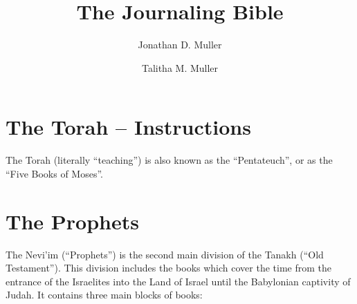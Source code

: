 \documentclass[std]{jbible}
\title{The Journaling Bible}
\author{Jonathan D. Muller}
\author{Talitha M. Muller}
\begin{document}
\maketitle

\clearpage

\frontmatter
\tableofcontents{}



\mainmatter

\part{The Torah -- Instructions}

The Torah (literally ``teaching'') is also known as the ``Pentateuch'', or as the ``Five Books of Moses''.







\part{The Prophets}

The Nevi'im (``Prophets'') is the second main division of the Tanakh (``Old Testament''). This division includes the books which cover the time from the entrance of the Israelites into the Land of Israel until the Babylonian captivity of Judah. It contains three main blocks of books:
\end{document}
